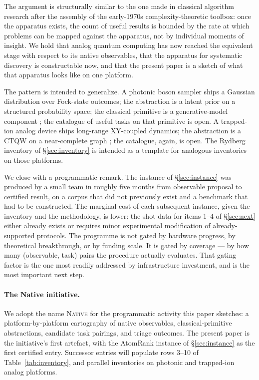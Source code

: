 \documentclass[10pt]{article}
\begin{document}
The argument is structurally similar to the one made in classical algorithm research after the assembly of the early-1970s complexity-theoretic toolbox: once the apparatus exists, the count of useful results is bounded by the rate at which problems can be mapped against the apparatus, not by individual moments of insight. We hold that analog quantum computing has now reached the equivalent stage with respect to its native observables, that the apparatus for systematic discovery is constructable now, and that the present paper is a sketch of what that apparatus looks like on one platform.

The pattern is intended to generalize. A photonic boson sampler ships a Gaussian distribution over Fock-state outcomes; the abstraction is a latent prior on a structured probability space; the classical primitive is a generative-model component \cite{jurczak2026quantumlatent}; the catalogue of useful tasks on that primitive is open. A trapped-ion analog device ships long-range XY-coupled dynamics; the abstraction is a CTQW on a near-complete graph \cite{farhi1998quantum}; the catalogue, again, is open. The Rydberg inventory of \S\ref{sec:inventory} is intended as a template for analogous inventories on those platforms.

We close with a programmatic remark. The instance of \S\ref{sec:instance} was produced by a small team in roughly five months from observable proposal to certified result, on a corpus that did not previously exist and a benchmark that had to be constructed. The marginal cost of each subsequent instance, given the inventory and the methodology, is lower: the shot data for items 1--4 of \S\ref{sec:next} either already exists \cite{jurczak2026qoulipo_dataset} or requires minor experimental modification of already-supported protocols. The programme is not gated by hardware progress, by theoretical breakthrough, or by funding scale. It is gated by coverage --- by how many (observable, task) pairs the procedure actually evaluates. That gating factor is the one most readily addressed by infrastructure investment, and is the most important next step.

\paragraph{The Native initiative.}
We adopt the name \textsc{Native} for the programmatic activity this paper sketches: a platform-by-platform cartography of native observables, classical-primitive abstractions, candidate task pairings, and triage outcomes. The present paper is the initiative's first artefact, with the AtomRank instance of \S\ref{sec:instance} \cite{jurczak2026atomrank} as the first certified entry. Successor entries will populate rows 3--10 of Table~\ref{tab:inventory}, and parallel inventories on photonic and trapped-ion analog platforms.
\end{document}
